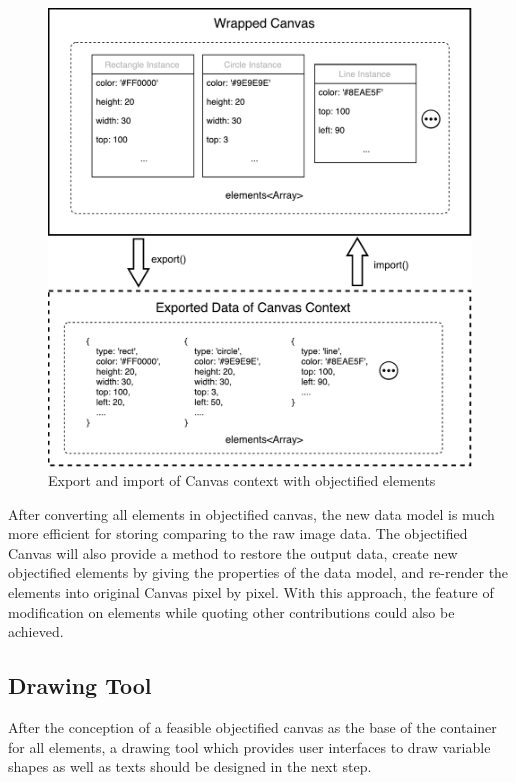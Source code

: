 \begin{figure}[!htbp]
  \centering
    \includegraphics[width=1\textwidth]{Figures/concept-wrapped-canvas-data.pdf}
  \caption{Export and import of Canvas context with objectified elements}
  \label{fig:objectified-canvas-data}
\end{figure}

After converting all elements in objectified canvas, the new data model is much more efficient for storing comparing to the raw image data. The objectified Canvas will also provide a method to restore the output data, create new objectified elements by giving the properties of the data model, and re-render the elements into original Canvas pixel by pixel. With this approach, the feature of modification on elements while quoting other contributions could also be achieved. 

\subsection{Drawing Tool}

After the conception of a feasible objectified canvas as the base of the container for all elements, a drawing tool which provides user interfaces to draw variable shapes as well as texts should be designed in the next step. 

